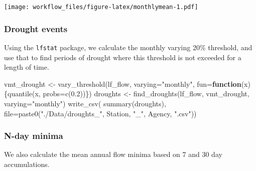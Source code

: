 \documentclass[
]{article}
\newenvironment{Shaded}{\begin{snugshade}}{\end{snugshade}}
\newcommand{\AttributeTok}[1]{\textcolor[rgb]{0.77,0.63,0.00}{#1}}
\newcommand{\ControlFlowTok}[1]{\textcolor[rgb]{0.13,0.29,0.53}{\textbf{#1}}}
\newcommand{\FloatTok}[1]{\textcolor[rgb]{0.00,0.00,0.81}{#1}}
\newcommand{\FunctionTok}[1]{\textcolor[rgb]{0.00,0.00,0.00}{#1}}
\newcommand{\NormalTok}[1]{#1}
\newcommand{\OtherTok}[1]{\textcolor[rgb]{0.56,0.35,0.01}{#1}}
\newcommand{\StringTok}[1]{\textcolor[rgb]{0.31,0.60,0.02}{#1}}
\begin{document}
\texttt{[image: workflow\_files/figure-latex/monthlymean-1.pdf]}

\hypertarget{drought-events}{%
\subsubsection{Drought events}\label{drought-events}}

Using the \texttt{lfstat} package, we calculate the monthly varying 20\%
threshold, and use that to find periods of drought where this threshold
is not exceeded for a length of time.

\begin{Shaded}
\begin{Highlighting}[]
\NormalTok{vmt\_drought }\OtherTok{\textless{}{-}} \FunctionTok{vary\_threshold}\NormalTok{(lf\_flow,}
                      \AttributeTok{varying=}\StringTok{"monthly"}\NormalTok{,}
                      \AttributeTok{fun=}\ControlFlowTok{function}\NormalTok{(x)\{}\FunctionTok{quantile}\NormalTok{(x, }\AttributeTok{probs=}\FunctionTok{c}\NormalTok{(}\FloatTok{0.2}\NormalTok{))\})}
\NormalTok{droughts }\OtherTok{\textless{}{-}} \FunctionTok{find\_droughts}\NormalTok{(lf\_flow, vmt\_drought, }\AttributeTok{varying=}\StringTok{"monthly"}\NormalTok{)}
\FunctionTok{write\_csv}\NormalTok{(}
  \FunctionTok{summary}\NormalTok{(droughts), }\AttributeTok{file=}\FunctionTok{paste0}\NormalTok{(}\StringTok{"./Data/droughts\_"}\NormalTok{, Station, }\StringTok{"\_"}\NormalTok{, Agency, }\StringTok{".csv"}\NormalTok{))}
\end{Highlighting}
\end{Shaded}

\hypertarget{n-day-minima}{%
\subsubsection{N-day minima}\label{n-day-minima}}

We also calculate the mean annual flow minima based on 7 and 30 day
accumulations.
\end{document}
